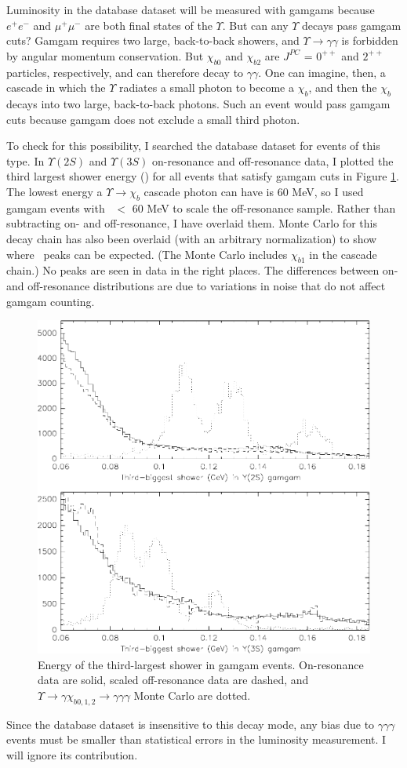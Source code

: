 Luminosity in the database dataset will be measured with gamgams
because $e^+e^-$ and $\mu^+\mu^-$ are both final states of the
$\Upsilon$.  But can any $\Upsilon$ decays pass gamgam cuts?  Gamgam
requires two large, back-to-back showers, and $\Upsilon \to
\gamma\gamma$ is forbidden by angular momentum conservation.  But
$\chi_{b0}$ and $\chi_{b2}$ are $J^{PC}$ = $0^{++}$ and $2^{++}$
particles, respectively, and can therefore decay to $\gamma\gamma$.
One can imagine, then, a cascade in which the $\Upsilon$ radiates a
small photon to become a $\chi_b$, and then the $\chi_b$ decays into
two large, back-to-back photons.  Such an event would pass gamgam cuts
because gamgam does not exclude a small third photon.

To check for this possibility, I searched the database dataset for
events of this type.  In $\Upsilon(2S)$ and $\Upsilon(3S)$
on-resonance and off-resonance data, I plotted the third largest
shower energy (\ethree) for all events that satisfy gamgam cuts in
Figure \ref{gamgam_chibkgnd}.  The lowest energy a $\Upsilon \to
\chi_b$ cascade photon can have is 60 MeV, so I used gamgam events
with \ethree\ $<$ 60 MeV to scale the off-resonance sample.  Rather
than subtracting on- and off-resonance, I have overlaid them.  Monte
Carlo for this decay chain has also been overlaid (with an arbitrary
normalization) to show where \ethree\ peaks can be expected.  (The
Monte Carlo includes $\chi_{b1}$ in the cascade chain.)  No peaks are
seen in data in the right places.  The differences between on- and
off-resonance distributions are due to variations in noise that do not
affect gamgam counting.

\begin{figure}
  \includegraphics[width=\linewidth]{plots/gamgam_chibkgnd}
  \caption{\label{gamgam_chibkgnd} Energy of the third-largest shower
    in gamgam events.  On-resonance data are solid, scaled
    off-resonance data are dashed, and $\Upsilon \to \gamma
    \chi_{b0,1,2} \to \gamma \gamma \gamma$ Monte Carlo are dotted.}
\end{figure}

Since the database dataset is insensitive to this decay mode, any bias
due to $\gamma\gamma\gamma$ events must be smaller than statistical
errors in the luminosity measurement.  I will ignore its contribution.
